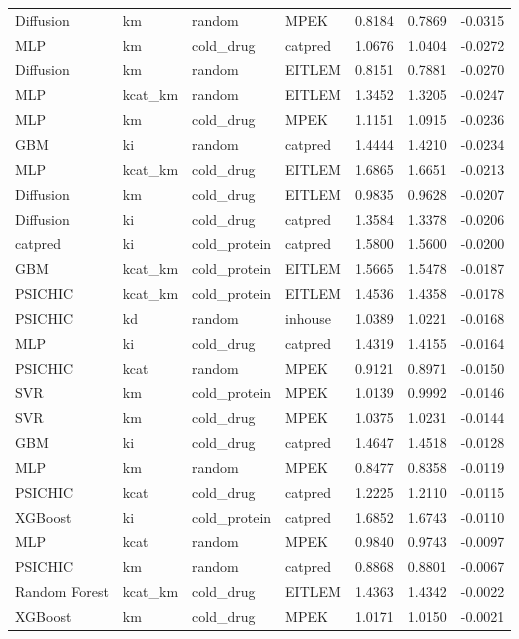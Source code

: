 \begin{tabular}{llllrrr}
Diffusion & km & random & MPEK & 0.8184 & 0.7869 & -0.0315 \\
MLP & km & cold_drug & catpred & 1.0676 & 1.0404 & -0.0272 \\
Diffusion & km & random & EITLEM & 0.8151 & 0.7881 & -0.0270 \\
MLP & kcat_km & random & EITLEM & 1.3452 & 1.3205 & -0.0247 \\
MLP & km & cold_drug & MPEK & 1.1151 & 1.0915 & -0.0236 \\
GBM & ki & random & catpred & 1.4444 & 1.4210 & -0.0234 \\
MLP & kcat_km & cold_drug & EITLEM & 1.6865 & 1.6651 & -0.0213 \\
Diffusion & km & cold_drug & EITLEM & 0.9835 & 0.9628 & -0.0207 \\
Diffusion & ki & cold_drug & catpred & 1.3584 & 1.3378 & -0.0206 \\
catpred & ki & cold_protein & catpred & 1.5800 & 1.5600 & -0.0200 \\
GBM & kcat_km & cold_protein & EITLEM & 1.5665 & 1.5478 & -0.0187 \\
PSICHIC & kcat_km & cold_protein & EITLEM & 1.4536 & 1.4358 & -0.0178 \\
PSICHIC & kd & random & inhouse & 1.0389 & 1.0221 & -0.0168 \\
MLP & ki & cold_drug & catpred & 1.4319 & 1.4155 & -0.0164 \\
PSICHIC & kcat & random & MPEK & 0.9121 & 0.8971 & -0.0150 \\
SVR & km & cold_protein & MPEK & 1.0139 & 0.9992 & -0.0146 \\
SVR & km & cold_drug & MPEK & 1.0375 & 1.0231 & -0.0144 \\
GBM & ki & cold_drug & catpred & 1.4647 & 1.4518 & -0.0128 \\
MLP & km & random & MPEK & 0.8477 & 0.8358 & -0.0119 \\
PSICHIC & kcat & cold_drug & catpred & 1.2225 & 1.2110 & -0.0115 \\
XGBoost & ki & cold_protein & catpred & 1.6852 & 1.6743 & -0.0110 \\
MLP & kcat & random & MPEK & 0.9840 & 0.9743 & -0.0097 \\
PSICHIC & km & random & catpred & 0.8868 & 0.8801 & -0.0067 \\
Random Forest & kcat_km & cold_drug & EITLEM & 1.4363 & 1.4342 & -0.0022 \\
XGBoost & km & cold_drug & MPEK & 1.0171 & 1.0150 & -0.0021 \\

\end{tabular}
